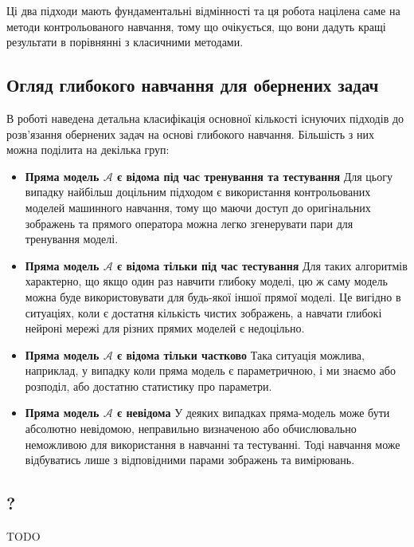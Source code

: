 \documentclass[14pt,a4paper]{extarticle}
\newcounter{e}
\numberwithin{equation}{section}
\numberwithin{figure}{section}
\begin{document}
	Ці два підходи мають фундаментальні відмінності та ця робота націлена саме на методи контрольованого навчання, тому що очікується, що вони дадуть кращі результати в порівнянні з класичними методами. 
	
	\subsection{Огляд глибокого навчання для обернених задач}
	
	В роботі \cite{ongie2020deep} наведена детальна класифікація основної кількості існуючих підходів до розв'язання обернених задач на основі глибокого навчання. 	Більшість з них можна поділита на декілька груп:
	\begin{itemize}
		\item \textbf{Пряма модель $\mathcal{A}$ є відома під час тренування та тестування} \newline
		Для цьогу випадку найбільш доцільним підходом є використання контрольованих моделей машинного навчання, тому що маючи доступ до оригінальних зображень та прямого оператора можна легко згенерувати пари для тренування моделі.
				
		\item \textbf{Пряма модель $\mathcal{A}$ є відома тільки під час тестування} \newline
		Для таких алгоритмів характерно, що якщо один раз навчити глибоку моделі, цю ж саму модель можна буде використовувати для будь-якої іншої прямої моделі. Це вигідно в ситуаціях, коли є достатня кількість чистих зображень, а навчати глибокі нейроні мережі для різних прямих моделей є недоцільно.
		

		\item \textbf{Пряма модель $\mathcal{A}$ є відома тільки частково} \newline
		Така ситуація можлива, наприклад, у випадку коли пряма модель є параметричною, і ми знаємо або розподіл, або
		достатню статистику про параметри.

		\item \textbf{Пряма модель $\mathcal{A}$ є невідома} \newline
		У деяких випадках пряма-модель може бути абсолютно невідомою, неправильно визначеною або обчислювально неможливою для використання в навчанні та тестуванні. Тоді навчання може відбуватись лише з відповідними парами зображень та вимірювань. 
	\end{itemize}

	\subsection{?}
	TODO
	
\end{document}
